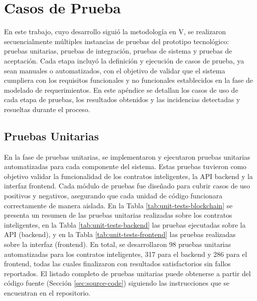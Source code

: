 \chapter{Casos de Prueba}
\label{cp:tests-execution-results}

En este trabajo, cuyo desarrollo siguió la metodología en V, se realizaron secuencialmente múltiples instancias de pruebas del prototipo tecnológico: pruebas unitarias, pruebas de integración, pruebas de sistema y pruebas de aceptación. Cada etapa incluyó la definición y ejecución de casos de prueba, ya sean manuales o automatizados, con el objetivo de validar que el sistema cumpliera con los requisitos funcionales y no funcionales establecidos en la fase de modelado de requerimientos. En este apéndice se detallan los casos de uso de cada etapa de pruebas, los resultados obtenidos y las incidencias detectadas y resueltas durante el proceso.

\section{Pruebas Unitarias}
\label{sec:unit-testing-details}

En la fase de pruebas unitarias, se implementaron y ejecutaron pruebas unitarias automatizadas para cada componente del sistema. Estas pruebas tuvieron como objetivo validar la funcionalidad de los contratos inteligentes, la API backend y la interfaz frontend. Cada módulo de pruebas fue diseñado para cubrir casos de uso positivos y negativos, asegurando que cada unidad de código funcionara correctamente de manera aislada. En la Tabla \ref{tab:unit-tests-blockchain} se presenta un resumen de las pruebas unitarias realizadas sobre los contratos inteligentes, en la Tabla \ref{tab:unit-tests-backend} las pruebas ejecutadas sobre la API (backend), y en la Tabla \ref{tab:unit-tests-frontend} las pruebas realizadas sobre la interfaz (frontend). En total, se desarrollaron 98 pruebas unitarias automatizadas para los contratos inteligentes, 317 para el backend y 286 para el frontend, todas las cuales finalizaron con resultados satisfactorios sin fallos reportados. El listado completo de pruebas unitarias puede obtenerse a partir del código fuente (Sección \ref{sec:source-code}) siguiendo las instrucciones que se encuentran en el repositorio.


